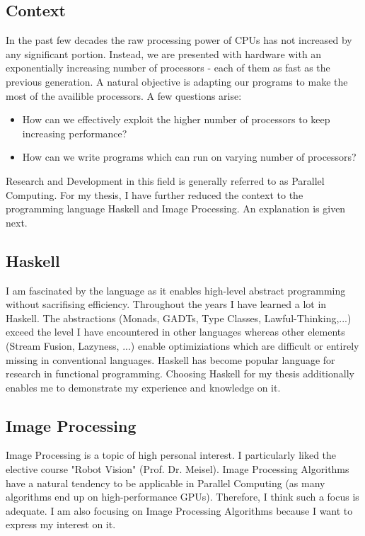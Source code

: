 \documentclass{article}
\begin{document}
    \subsection{Context}
    In the past few decades the raw processing power of CPUs has not increased by any significant portion.
    Instead, we are presented with hardware with an exponentially increasing
    number of processors - each of them as fast as the previous generation.
    A natural objective is adapting our programs to make the most of the availible
    processors. A few questions arise:
    \begin{itemize}
        \item How can we effectively exploit the higher number of processors to keep increasing performance?
        \item How can we write programs which can run on varying number of processors?
    \end{itemize}
    Research and Development in this field is generally referred to as Parallel Computing.
    For my thesis, I have further reduced the context to the programming language Haskell and Image Processing. An explanation is given next.
    
    \subsection{Haskell}
    I am fascinated by the language as it enables
    high-level abstract programming without sacrifising efficiency.
    Throughout the years I have learned a lot in Haskell.
    The abstractions (Monads, GADTs, Type Classes, Lawful-Thinking,...) exceed the level I have encountered in other languages
    whereas other elements (Stream Fusion, Lazyness, ...) enable optimiziations which are difficult or entirely missing in conventional languages.
    Haskell has become popular language for research in functional programming.
    Choosing Haskell for my thesis additionally enables me to demonstrate my experience and knowledge on it.
    
    \subsection{Image Processing}
    Image Processing is a topic of high personal interest.
    I particularly liked the elective course "Robot Vision" (Prof. Dr. Meisel).
    Image Processing Algorithms have a natural tendency to be applicable in Parallel Computing (as many algorithms end up on high-performance GPUs).
    Therefore, I think such a focus is adequate.
    I am also focusing on Image Processing Algorithms because I want to express my interest on it.
     
\end{document}
